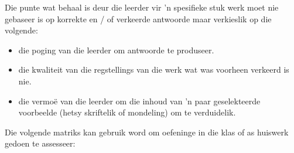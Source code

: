 Die punte wat behaal is deur die leerder vir 'n spesifieke stuk werk moet nie gebaseer is op korrekte en / of verkeerde antwoorde maar verkieslik op die volgende:

\begin{itemize}[noitemsep]
\item
  die poging van die leerder om antwoorde te produseer.
\item
  die kwaliteit van die regstellings van die werk wat was voorheen verkeerd is nie.
\item
  die vermoë van die leerder om die inhoud van 'n paar geselekteerde voorbeelde (hetsy skriftelik of mondeling) om te verduidelik.
\end{itemize}
Die volgende matriks kan gebruik word om oefeninge in die klas of as huiswerk gedoen te assesseer:

